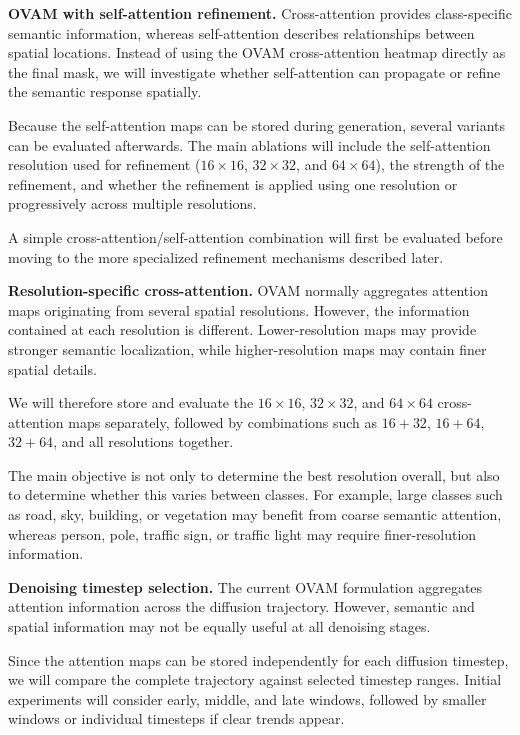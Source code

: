 \documentclass[11pt,a4paper]{article}
\begin{document}
\textbf{OVAM with self-attention refinement.}
Cross-attention provides class-specific semantic information, whereas
self-attention describes relationships between spatial locations. Instead of using
the OVAM cross-attention heatmap directly as the final mask, we will investigate
whether self-attention can propagate or refine the semantic response spatially.

Because the self-attention maps can be stored during generation, several variants
can be evaluated afterwards. The main ablations will include the self-attention
resolution used for refinement ($16\times16$, $32\times32$, and $64\times64$),
the strength of the refinement, and whether the refinement is applied using one
resolution or progressively across multiple resolutions.

A simple cross-attention/self-attention combination will first be evaluated before
moving to the more specialized refinement mechanisms described later.

\textbf{Resolution-specific cross-attention.}
OVAM normally aggregates attention maps originating from several spatial
resolutions. However, the information contained at each resolution is different.
Lower-resolution maps may provide stronger semantic localization, while
higher-resolution maps may contain finer spatial details.

We will therefore store and evaluate the $16\times16$, $32\times32$, and
$64\times64$ cross-attention maps separately, followed by combinations such as
$16+32$, $16+64$, $32+64$, and all resolutions together.

The main objective is not only to determine the best resolution overall, but also
to determine whether this varies between classes. For example, large classes such
as road, sky, building, or vegetation may benefit from coarse semantic attention,
whereas person, pole, traffic sign, or traffic light may require finer-resolution
information.

\textbf{Denoising timestep selection.}
The current OVAM formulation aggregates attention information across the diffusion
trajectory. However, semantic and spatial information may not be equally useful at
all denoising stages.

Since the attention maps can be stored independently for each diffusion timestep,
we will compare the complete trajectory against selected timestep ranges. Initial
experiments will consider early, middle, and late windows, followed by smaller
windows or individual timesteps if clear trends appear.
\end{document}
